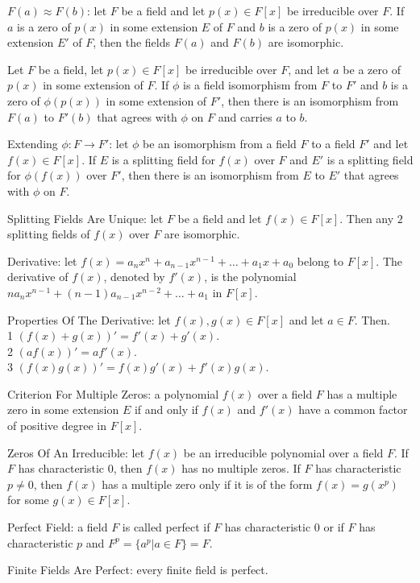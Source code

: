 $F(a) \approx F(b)$: let $F$ be a field and let $p(x) \in F[x]$ be irreducible over $F$. If $a$ is a zero of $p(x)$ in some extension $E$ of $F$ and $b$ is a zero of $p(x)$ in some extension $E'$ of $F$, then the fields $F(a)$ and $F(b)$ are isomorphic.

Let $F$ be a field, let $p(x) \in F[x]$ be irreducible over $F$, and let $a$ be a zero of $p(x)$ in some extension of $F$. If $\phi$ is a field isomorphism from $F$ to $F'$ and $b$ is a zero of $\phi (p(x))$ in some extension of $F'$, then there is an isomorphism from $F(a)$ to $F'(b)$ that agrees with $\phi$ on $F$ and carries $a$ to $b$.

Extending $\phi: F \to F'$: let $\phi$ be an isomorphism from a field $F$ to a field $F'$ and let $f(x) \in F[x]$. If $E$ is a splitting field for $f(x)$ over $F$ and $E'$ is a splitting field for $\phi (f(x))$ over $F'$, then there is an isomorphism from $E$ to $E'$ that agrees with $\phi$ on $F$.

Splitting Fields Are Unique: let $F$ be a field and let $f(x) \in F[x]$. Then any $2$ splitting fields of $f(x)$ over $F$ are isomorphic.

Derivative: let $f(x) = a_n x^{n} + a_{n-1} x^{n-1} + \dots + a_1 x + a_0$ belong to $F[x]$. The derivative of $f(x)$, denoted by $f'(x)$, is the polynomial $n a_n x^{n-1} + (n-1) a_{n-1} x^{n-2} + \dots + a_1$ in $F[x]$.

Properties Of The Derivative: let $f(x),g(x) \in F[x]$ and let $a \in F$. Then. \\
1 $(f(x)+g(x))'=f'(x)+g'(x)$. \\
2 $(af(x))'=af'(x)$. \\
3 $(f(x)g(x))'=f(x)g'(x)+f'(x)g(x)$.

Criterion For Multiple Zeros: a polynomial $f(x)$ over a field $F$ has a multiple zero in some extension $E$ if and only if $f(x)$ and $f'(x)$ have a common factor of positive degree in $F[x]$.

Zeros Of An Irreducible: let $f(x)$ be an irreducible polynomial over a field $F$. If $F$ has characteristic $0$, then $f(x)$ has no multiple zeros. If $F$ has characteristic $p \neq 0$, then $f(x)$ has a multiple zero only if it is of the form $f(x)=g(x^p)$ for some $g(x) \in F[x]$.

Perfect Field: a field $F$ is called perfect if $F$ has characteristic $0$ or if $F$ has characteristic $p$ and $F^p = \{ a^p | a \in F \} = F$.

Finite Fields Are Perfect: every finite field is perfect.

